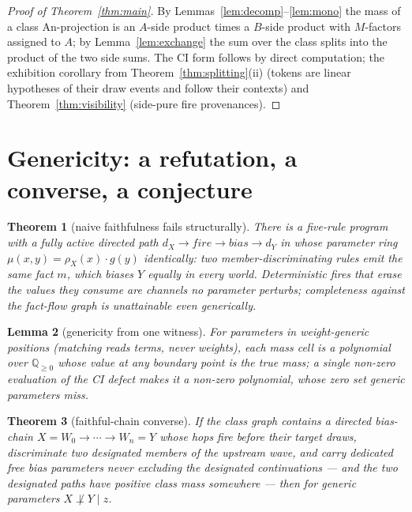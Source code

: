 \documentclass[11pt]{article}
\newcommand{\QQ}{\mathbb{Q}}
\newcommand{\CI}{\perp}
\newcommand{\An}{\mathrm{An}}
\newtheorem{theorem}{Theorem}[section]
\newtheorem{lemma}[theorem]{Lemma}
\theoremstyle{definition}
\theoremstyle{remark}
\begin{document}
\begin{proof}[Proof of Theorem~\ref{thm:main}]
By Lemmas~\ref{lem:decomp}--\ref{lem:mono} the mass of a class
$\An$-projection is an $A$-side product times a $B$-side product with
$M$-factors assigned to $A$; by Lemma~\ref{lem:exchange} the sum over
the class splits into the product of the two side sums.  The CI form
follows by direct computation; the exhibition corollary from
Theorem~\ref{thm:splitting}(ii) (tokens are linear hypotheses of their
draw events and follow their contexts) and
Theorem~\ref{thm:visibility} (side-pure fire provenances).
\end{proof}

\section{Genericity: a refutation, a converse, a conjecture}
\label{sec:genericity}

\begin{theorem}[naive faithfulness fails structurally]
\label{thm:refute}
There is a five-rule program with a fully active directed path
$d_X \to \mathit{fire} \to \mathit{bias} \to d_Y$ in whose parameter
ring $\mu(x,y) = \rho_X(x)\cdot g(y)$ \emph{identically}: two
member-discriminating rules emit the same fact $m$, which biases $Y$
equally in every world.  Deterministic fires that erase the values
they consume are channels no parameter perturbs; completeness against
the fact-flow graph is unattainable even generically.
\end{theorem}

\begin{lemma}[genericity from one witness]
\label{lem:generic}
For parameters in weight-generic positions (matching reads terms,
never weights), each mass cell is a polynomial over $\QQ_{\geq0}$
whose value at any boundary point is the true mass; a single non-zero
evaluation of the CI defect makes it a non-zero polynomial, whose
zero set generic parameters miss.
\end{lemma}

\begin{theorem}[faithful-chain converse]
\label{thm:chains}
If the class graph contains a directed bias-chain
$X = W_0 \to \cdots \to W_n = Y$ whose hops fire before their target
draws, discriminate two designated members of the upstream wave, and
carry dedicated free bias parameters never excluding the designated
continuations --- and the two designated paths have positive class
mass somewhere --- then for generic parameters $X \not\CI Y \mid z$.
\end{theorem}
\end{document}
